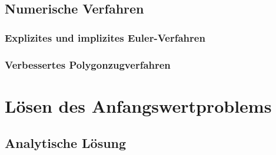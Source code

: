 \documentclass[
paper=A4,fontsize=12pt,
BCOR=15mm,DIV=22,
headinclude=true,footinclude=false,
parskip=full,
numbers=noendperiod,
ngerman,fleqn,             %
bibliography=totoc, %
toc=listof, %
cleardoublepage=empty,      %
version = last
]{scrartcl}
\begin{document}
\subsection{Numerische Verfahren}

\subsubsection{Explizites und implizites Euler-Verfahren}

\subsubsection{Verbessertes Polygonzugverfahren}


\section{Lösen des Anfangswertproblems}
\subsection{Analytische Lösung}
\end{document}
